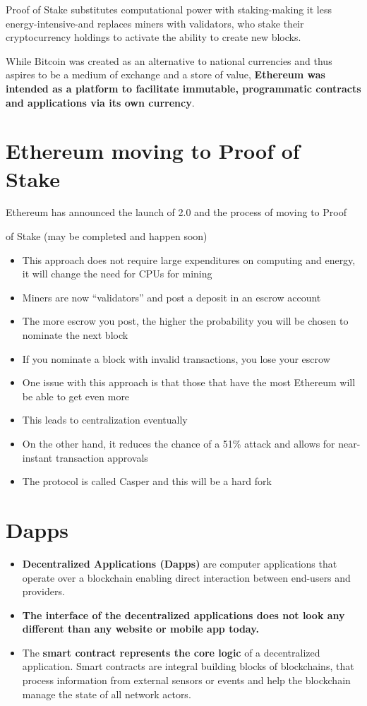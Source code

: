 Proof of Stake substitutes computational power with staking-making it less energy-intensive-and replaces miners with validators, who stake their cryptocurrency holdings to activate the ability to create new blocks.

While Bitcoin was created as an alternative to national currencies and thus aspires to be a medium of exchange and a store of value, \textbf{Ethereum was intended as a platform to facilitate immutable, programmatic contracts and applications via its own currency}.

\section{Ethereum moving to Proof of Stake}

Ethereum has announced the launch of 2.0 and the process of moving to Proof

of Stake (may be completed and happen soon)
\begin{itemize}
	\item This approach does not require large expenditures on computing and energy, it will change the need for CPUs for mining
	\item Miners are now ``validators'' and post a deposit in an escrow account
	\item The more escrow you post, the higher the probability you will be chosen to nominate the next block
	\item If you nominate a block with invalid transactions, you lose your escrow
	\item One issue with this approach is that those that have the most Ethereum will be able to get even more
	\item This leads to centralization eventually
	\item On the other hand, it reduces the chance of a 51\% attack and allows for near-instant transaction approvals
	\item The protocol is called Casper and this will be a hard fork
\end{itemize}

\section{Dapps}

\begin{itemize}
	\item \textbf{Decentralized Applications (Dapps)} are computer applications that operate over a blockchain enabling direct interaction between end-users and providers.
	\item \textbf{The interface of the decentralized applications does not look any different than any website or mobile app today.}
	\item The \textbf{smart contract represents the core logic} of a decentralized application. Smart contracts are integral building blocks of blockchains, that process information from external sensors or events and help the blockchain manage the state of all network actors.
\end{itemize}

